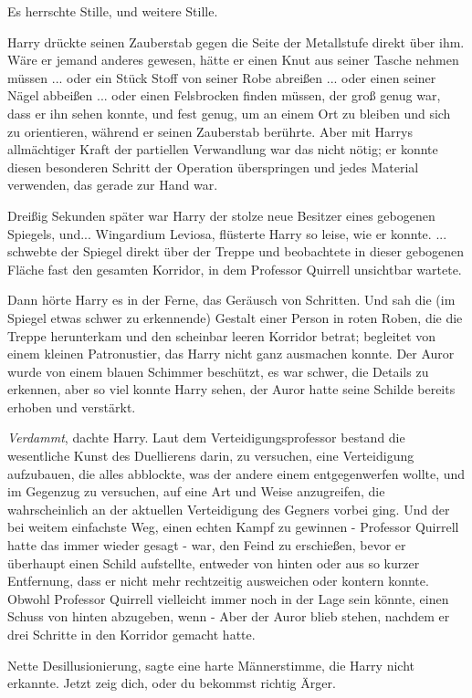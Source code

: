 Es herrschte Stille, und weitere Stille.

Harry drückte seinen Zauberstab gegen die Seite der Metallstufe direkt über ihm.
Wäre er jemand anderes gewesen, hätte er einen Knut aus seiner Tasche nehmen
müssen ... oder ein Stück Stoff von seiner Robe abreißen ... oder einen seiner
Nägel abbeißen ... oder einen Felsbrocken finden müssen, der groß genug war,
dass er ihn sehen konnte, und fest genug, um an einem Ort zu bleiben und sich zu
orientieren, während er seinen Zauberstab berührte. Aber mit Harrys allmächtiger
Kraft der partiellen Verwandlung war das nicht nötig; er konnte diesen
besonderen Schritt der Operation überspringen und jedes Material verwenden, das
gerade zur Hand war.

Dreißig Sekunden später war Harry der stolze neue Besitzer eines gebogenen
Spiegels, und... \glqq{}Wingardium Leviosa\grqq{}, flüsterte Harry so leise, wie
er konnte. ... schwebte der Spiegel direkt über der Treppe und beobachtete in
dieser gebogenen Fläche fast den gesamten Korridor, in dem Professor Quirrell
unsichtbar wartete.

Dann hörte Harry es in der Ferne, das Geräusch von Schritten. Und sah die (im
Spiegel etwas schwer zu erkennende) Gestalt einer Person in roten Roben, die die
Treppe herunterkam und den scheinbar leeren Korridor betrat; begleitet von einem
kleinen Patronustier, das Harry nicht ganz ausmachen konnte. Der Auror wurde von
einem blauen Schimmer beschützt, es war schwer, die Details zu erkennen, aber so
viel konnte Harry sehen, der Auror hatte seine Schilde bereits erhoben und
verstärkt.

\emph{Verdammt}, dachte Harry. Laut dem Verteidigungsprofessor bestand die
wesentliche Kunst des Duellierens darin, zu versuchen, eine Verteidigung
aufzubauen, die alles abblockte, was der andere einem entgegenwerfen wollte, und
im Gegenzug zu versuchen, auf eine Art und Weise anzugreifen, die wahrscheinlich
an der aktuellen Verteidigung des Gegners vorbei ging. Und der bei weitem
einfachste Weg, einen echten Kampf zu gewinnen - Professor Quirrell hatte das
immer wieder gesagt - war, den Feind zu erschießen, bevor er überhaupt einen
Schild aufstellte, entweder von hinten oder aus so kurzer Entfernung, dass er
nicht mehr rechtzeitig ausweichen oder kontern konnte. Obwohl Professor Quirrell
vielleicht immer noch in der Lage sein könnte, einen Schuss von hinten
abzugeben, wenn - Aber der Auror blieb stehen, nachdem er drei Schritte in den
Korridor gemacht hatte.

\glqq{}Nette Desillusionierung\grqq{}, sagte eine harte Männerstimme, die Harry
nicht erkannte. \glqq{}Jetzt zeig dich, oder du bekommst richtig Ärger.\grqq{}

